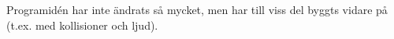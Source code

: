 Programidén har inte ändrats så mycket,
men har till viss del byggts vidare på (t.ex. med kollisioner och ljud).

